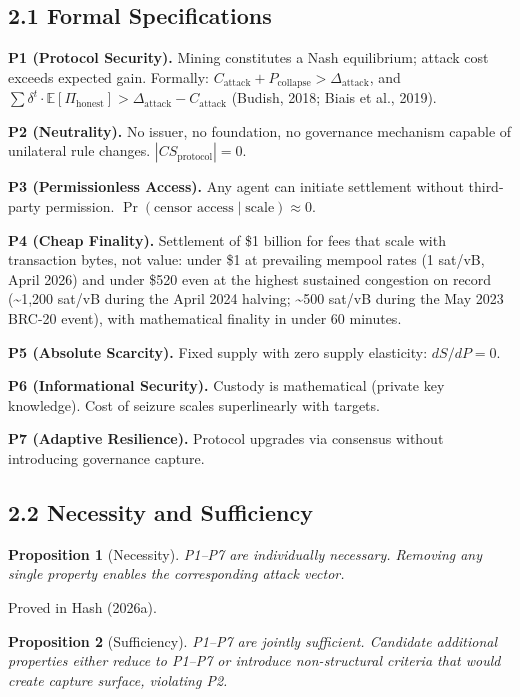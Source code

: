 \documentclass[12pt]{article}
\newtheorem{proposition}{Proposition}
\theoremstyle{definition}
\theoremstyle{remark}
\newcommand{\E}{\mathbb{E}}
\begin{document}
\subsection{2.1 Formal Specifications}

\noindent\textbf{P1 (Protocol Security).} Mining constitutes a Nash equilibrium;
attack cost exceeds expected gain. Formally:
$C_\text{attack} + P_\text{collapse} > \Delta_\text{attack}$, and
$\sum \delta^t \cdot \E[\Pi_\text{honest}] > \Delta_\text{attack} - C_\text{attack}$
(Budish, 2018; Biais et al., 2019).

\noindent\textbf{P2 (Neutrality).} No issuer, no foundation, no governance
mechanism capable of unilateral rule changes. $|CS_\text{protocol}| = 0$.

\noindent\textbf{P3 (Permissionless Access).} Any agent can initiate settlement
without third-party permission. $\Pr(\text{censor access} \mid \text{scale}) \approx 0$.

\noindent\textbf{P4 (Cheap Finality).} Settlement of \$1 billion for fees that
scale with transaction bytes, not value: under \$1 at prevailing mempool
rates (1 sat/vB, April 2026) and under \$520 even at the highest
sustained congestion on record (\textasciitilde1,200 sat/vB during the
April 2024 halving; \textasciitilde500 sat/vB during the May 2023
BRC-20 event), with mathematical finality in under 60 minutes.

\noindent\textbf{P5 (Absolute Scarcity).} Fixed supply with zero supply
elasticity: $dS/dP = 0$.

\noindent\textbf{P6 (Informational Security).} Custody is mathematical (private
key knowledge). Cost of seizure scales superlinearly with targets.

\noindent\textbf{P7 (Adaptive Resilience).} Protocol upgrades via consensus
without introducing governance capture.

\subsection{2.2 Necessity and Sufficiency}

\begin{proposition}[Necessity]
P1--P7 are individually necessary. Removing any single property enables
the corresponding attack vector.
\end{proposition}

\noindent Proved in Hash (2026a).

\begin{proposition}[Sufficiency]
P1--P7 are jointly sufficient. Candidate additional properties either
reduce to P1--P7 or introduce non-structural criteria that would create
capture surface, violating P2.
\end{proposition}
\end{document}
